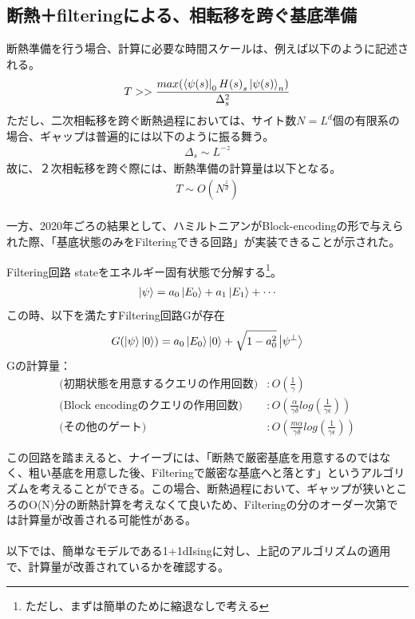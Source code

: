 \documentclass[a4paper,10.5pt]{article}
\numberwithin{equation}{section}
\begin{document}
\subsection{断熱＋filteringによる、相転移を跨ぐ基底準備}
断熱準備を行う場合、計算に必要な時間スケールは、例えば以下のように記述される。
\begin{equation}
    T>>\frac{max(\bra{\psi(s)}_{0}{H(s)}_{s}\ket{\psi(s)}_{n})}{\Delta_{s}^{2}}
\end{equation}
ただし、二次相転移を跨ぐ断熱過程においては、サイト数$N=L^{d}$個の有限系の場合、ギャップは普遍的には以下のように振る舞う。
\begin{align*}
    \Delta_{s}\sim L^{-z}
\end{align*}
故に、２次相転移を跨ぐ際には、断熱準備の計算量は以下となる。
\begin{align*}
    T\sim O(N^{\frac{z}{d}})
\end{align*}
\\
一方、2020年ごろの結果として、ハミルトニアンがBlock-encodingの形で与えられた際、「基底状態のみをFilteringできる回路」が実装できることが示された。
\begin{resultbox}{Filtering回路}
    stateをエネルギー固有状態で分解する\footnote{ただし、まずは簡単のために縮退なしで考える}。
    \begin{align*}
        \ket{\psi}=a_{0}\ket{E_{0}}+a_{1}\ket{E_{1}}+\cdots
    \end{align*}
    この時、以下を満たすFiltering回路Gが存在
    \begin{align*}
        G(\ket{\psi}\ket{0})=a_{0}\ket{E_{0}}\ket{0}+\sqrt{1-a_{0}^{2}}\ket{\psi^{\perp}}
    \end{align*}
    Gの計算量：\\
    \begin{align*}
        \text{(初期状態を用意するクエリの作用回数)}&: O(\frac{1}{\gamma})\\
        \text{(Block encodingのクエリの作用回数)}&:O(\frac{\alpha}{\gamma\delta}log(\frac{1}{\gamma\epsilon}))\\
        \text{(その他のゲート)}&:O(\frac{m\alpha}{\gamma\delta}log(\frac{1}{\gamma\epsilon}))
    \end{align*}
\end{resultbox}
この回路を踏まえると、ナイーブには、「断熱で厳密基底を用意するのではなく、粗い基底を用意した後、Filteringで厳密な基底へと落とす」というアルゴリズムを考えることができる。この場合、断熱過程において、ギャップが狭いところのO(N)分の断熱計算を考えなくて良いため、Filteringの分のオーダー次第では計算量が改善される可能性がある。\\
\\
以下では、簡単なモデルである1+1dIsingに対し、上記のアルゴリズムの適用で、計算量が改善されているかを確認する。
\end{document}
